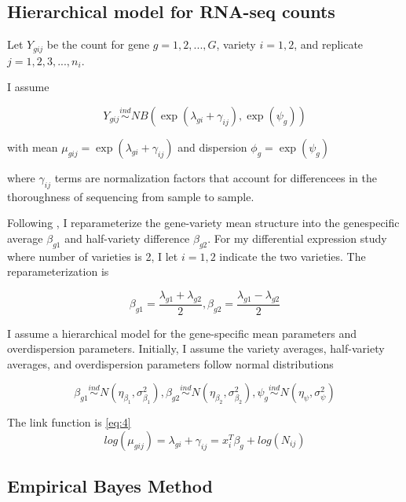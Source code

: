 \subsection{Hierarchical model for RNA-seq counts}

Let $Y_{gij}$ be the count for gene $g=1,2,..., G$, variety $i=1,2$, and replicate $j=1,2,3,...,n_i$.

I assume

\begin{equation}
\label{eq:1}
Y_{gij} \stackrel{ind}{\sim} NB(\exp(\lambda_{gi}+\gamma_{ij}), \exp(\psi_g))
\end{equation}

with mean $\mu_{gij} = \exp{(\lambda_{gi}+\gamma_{ij})}$ and dispersion $\phi_g = \exp{(\psi_g)}$

where $\gamma_{ij}$ terms are normalization factors that account for differencees in the thoroughness of sequencing from sample to sample. 

Following \citep{ji2014estimation}, I reparameterize the gene-variety mean structure into the genespecific average $\beta_{g1}$ and half-variety difference $\beta_{g2}$. For my differential expression study where number of varieties is 2, I let $i=1,2$ indicate the two varieties. The reparameterization is

\begin{equation}
\label{eq:2}
\beta_{g1} = \frac{\lambda_{g1}+\lambda_{g2}}{2}, \beta_{g2} = \frac{\lambda_{g1}-\lambda_{g2}}{2}
\end{equation}

I assume a hierarchical model for the gene-specific mean parameters and overdispersion parameters. Initially, I assume the variety averages, half-variety averages, and overdispersion parameters follow normal distributions

\begin{equation}
\label{eq:3}
\beta_{g1} \stackrel{ind}{\sim} N(\eta_{\beta_1}, \sigma^2_{\beta_1}), \beta_{g2} \stackrel{ind}{\sim} N(\eta_{\beta_2} , \sigma^2_{\beta_2}), \psi_g \stackrel{ind}{\sim} N(\eta_\psi, \sigma^2_\psi)
\end{equation}

The link function is \ref{eq:4}
\begin{equation}
\label{eq:4}
log(\mu_{gij}) = \lambda_{gi} + \gamma_{ij} = x_i^T \beta_g + log(N_{ij})
\end{equation}


\subsection{Empirical Bayes Method}

